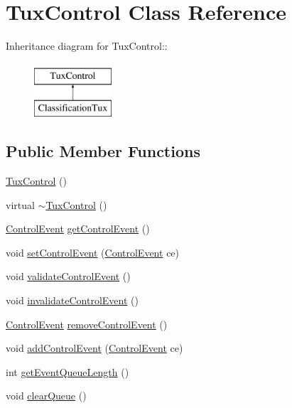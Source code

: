 \hypertarget{classTuxControl}{
\section{TuxControl Class Reference}
\label{classTuxControl}
}
Inheritance diagram for TuxControl::\begin{figure}[H]
\begin{center}
\leavevmode
\includegraphics[height=2cm]{classTuxControl}
\end{center}
\end{figure}
\subsection*{Public Member Functions}
\begin{DoxyCompactItemize}
\item 
\hyperlink{classTuxControl_a44c108889313709916fd0b58b80e4376}{TuxControl} ()
\item 
virtual \hyperlink{classTuxControl_a146627cfdc57247d2e653a8a48f9dd2b}{$\sim$TuxControl} ()
\item 
\hyperlink{structControlEvent}{ControlEvent} \hyperlink{classTuxControl_a2b8a3437fcabe73f06b9ee20a9044000}{getControlEvent} ()
\item 
void \hyperlink{classTuxControl_a36dc3a422109f1ce8858442c2d8e0ee6}{setControlEvent} (\hyperlink{structControlEvent}{ControlEvent} ce)
\item 
void \hyperlink{classTuxControl_adbe78251cc48f86e4ef5395c4374a834}{validateControlEvent} ()
\item 
void \hyperlink{classTuxControl_aa17c4139818a442407f0c0e8a84a9969}{invalidateControlEvent} ()
\item 
\hyperlink{structControlEvent}{ControlEvent} \hyperlink{classTuxControl_a3f2ed3813a924773ef979c3a03378e24}{removeControlEvent} ()
\item 
void \hyperlink{classTuxControl_a7b81a5759a1c10cdce1627e8b6cff1f2}{addControlEvent} (\hyperlink{structControlEvent}{ControlEvent} ce)
\item 
int \hyperlink{classTuxControl_a7574efb4a2375e3d33c4d3efe898a8ac}{getEventQueueLength} ()
\item 
void \hyperlink{classTuxControl_a3408b3c145883602c7c450c792eca529}{clearQueue} ()
\end{DoxyCompactItemize}


